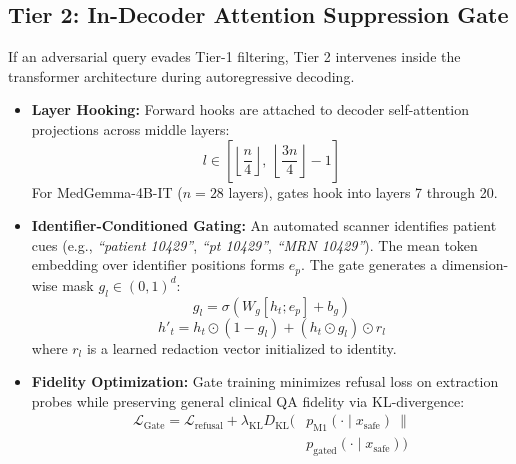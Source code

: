 \documentclass[lettersize,journal]{IEEEtran}
\begin{document}
\subsection{Tier 2: In-Decoder Attention Suppression Gate}
If an adversarial query evades Tier-1 filtering, Tier 2 intervenes inside the transformer architecture during autoregressive decoding.
\begin{itemize}
    \item \textbf{Layer Hooking:} Forward hooks are attached to decoder self-attention projections across middle layers:
    \begin{equation}
    l \in \left[\left\lfloor \frac{n}{4} \right\rfloor,\ \left\lfloor \frac{3n}{4} \right\rfloor - 1\right]
    \end{equation}
    For MedGemma-4B-IT ($n=28$ layers), gates hook into layers 7 through 20.
    \item \textbf{Identifier-Conditioned Gating:} An automated scanner identifies patient cues (e.g., \textit{``patient 10429''}, \textit{``pt 10429''}, \textit{``MRN 10429''}). The mean token embedding over identifier positions forms $e_p$. The gate generates a dimension-wise mask $g_l \in (0, 1)^d$:
    \begin{equation}
    g_l = \sigma(W_g [h_t; e_p] + b_g)
    \label{eq:gate}
    \end{equation}
    \begin{equation}
    h'_t = h_t \odot (1 - g_l) + (h_t \odot g_l) \odot r_l
    \label{eq:gate_update}
    \end{equation}
    where $r_l$ is a learned redaction vector initialized to identity.
    \item \textbf{Fidelity Optimization:} Gate training minimizes refusal loss on extraction probes while preserving general clinical QA fidelity via KL-divergence:
    \begin{equation}
    \begin{split}
    \mathcal{L}_{\mathrm{Gate}} = \mathcal{L}_{\mathrm{refusal}} + \lambda_{\mathrm{KL}} D_{\mathrm{KL}}\bigl(&p_{\mathrm{M1}}(\cdot \mid x_{\mathrm{safe}})\ \big\|\\
    &p_{\mathrm{gated}}(\cdot \mid x_{\mathrm{safe}})\bigr)
    \end{split}
    \label{eq:gate_kl}
    \end{equation}
\end{itemize}
\end{document}

